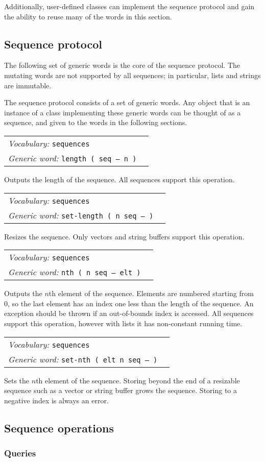 \documentclass{book}
\newcommand{\vocabulary}[1]{\emph{Vocabulary:} \texttt{#1}&\\}
\newcommand{\genericword}[2]{\index{\texttt{#1}}\emph{Generic word:} \texttt{#2}&\\}
\newcommand{\wordtable}[1]{

\begin{tabularx}{12cm}[t]{lX}
\hline
#1
\hline
\end{tabularx}

}
\begin{document}
Additionally, user-defined classes can implement the sequence protocol and gain the ability to reuse many of the words in this section.

\subsection{Sequence protocol}

The following set of generic words is the core of the sequence protocol. The mutating words are not supported by all sequences; in particular, lists and strings are immutable.

The sequence protocol consists of a set of generic words. Any object that is an instance of a class implementing these generic words can be thought of as a sequence, and given to the words in the following sections.

\wordtable{
\vocabulary{sequences}
\genericword{length}{length ( seq -- n )}
}
Outputs the length of the sequence. All sequences support this operation.
\wordtable{
\vocabulary{sequences}
\genericword{set-length}{set-length ( n seq -- )}
}
Resizes the sequence. Only vectors and string buffers support this operation.

\wordtable{
\vocabulary{sequences}
\genericword{nth}{nth ( n seq -- elt )}
}
Outputs the $n$th element of the sequence. Elements are numbered starting from 0, so the last element has an index one less than the length of the sequence. An exception should be thrown if an out-of-bounds index is accessed. All sequences support this operation, however with lists it has non-constant running time.

\wordtable{
\vocabulary{sequences}
\genericword{set-nth}{set-nth ( elt n seq -- )}
}
Sets the $n$th element of the sequence. Storing beyond the end of a resizable sequence such as a vector or string buffer grows the sequence. Storing to a negative index is always an error.

\subsection{Sequence operations}

\subsubsection{Queries}
\end{document}
